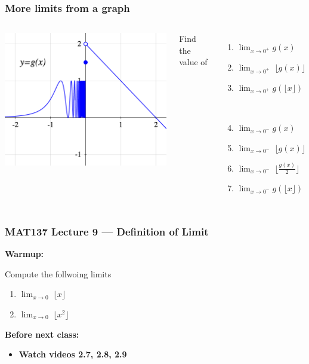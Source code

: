 \documentclass[14pt]{beamer}
\newcommand {\DS} [1] {${\displaystyle #1}$}
\newcommand{\floor}[1]{\lfloor #1 \rfloor}
\begin{document}
\begin{frame}
\frametitle{More limits from a graph}

\begin{columns}[c]


\includegraphics[scale=.4]{G2}

Find the value of 
\begin{enumerate}
			\item  \DS{\lim_{x \to 0^+} g(x)}
			\item \DS{\lim_{x \to 0^+} \; \floor{g(x)}}
			\item  \DS{\lim_{x \to 0^+} g(\floor{x})}
			
			\

			\item  \DS{\lim_{x \to 0^-} g(x)}
			\item \DS{\lim_{x \to 0^-} \; \floor{g(x)}}
			\item \DS{\lim_{x \to 0^-} \; \floor{\frac{g(x)}{2}}}
			\item  \DS{\lim_{x \to 0^-} g(\floor{x})}
\end{enumerate}
\end{columns}

\end{frame}

\begin{frame}
\frametitle{MAT137 Lecture 9 --- Definition of Limit}
	{\bf Warmup:}

	Compute the follwoing limits

	\bigskip
		\begin{enumerate}
			\item \DS{\lim_{x \to 0} \; \floor{x}}
			\item \DS{\lim_{x \to 0} \; \floor{x^2}}
		\end{enumerate}
	\vfill
	{\bf Before next class:}
		\begin{itemize} \normalsize
			\item {\bf Watch videos 2.7, 2.8, 2.9 }
		\end{itemize}
	\vfill

\end{frame}
\end{document}
